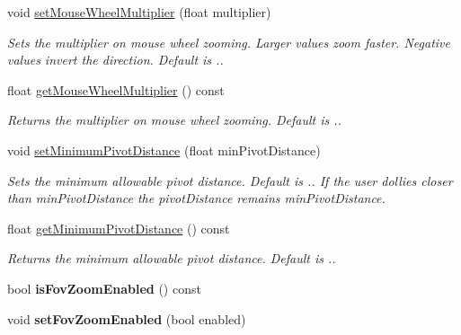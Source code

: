 \begin{DoxyCompactItemize}
\mbox{\label{classpepr3d_1_1_camera_ui_af34ec9925c96b8133cb4e69e2405532b}} 
void \mbox{\hyperlink{classpepr3d_1_1_camera_ui_af34ec9925c96b8133cb4e69e2405532b}{set\+Mouse\+Wheel\+Multiplier}} (float multiplier)
\begin{DoxyCompactList}\small\item\em Sets the multiplier on mouse wheel zooming. Larger values zoom faster. Negative values invert the direction. Default is {.}. \end{DoxyCompactList}\item 
\mbox{\label{classpepr3d_1_1_camera_ui_a92e74d770734c45b548318a71adc567e}} 
float \mbox{\hyperlink{classpepr3d_1_1_camera_ui_a92e74d770734c45b548318a71adc567e}{get\+Mouse\+Wheel\+Multiplier}} () const
\begin{DoxyCompactList}\small\item\em Returns the multiplier on mouse wheel zooming. Default is {.}. \end{DoxyCompactList}\item 
\mbox{\label{classpepr3d_1_1_camera_ui_a7e38eccabdb7ab5e70b232fee61e22c7}} 
void \mbox{\hyperlink{classpepr3d_1_1_camera_ui_a7e38eccabdb7ab5e70b232fee61e22c7}{set\+Minimum\+Pivot\+Distance}} (float min\+Pivot\+Distance)
\begin{DoxyCompactList}\small\item\em Sets the minimum allowable pivot distance. Default is {.}. If the user dollies closer than {\itshape min\+Pivot\+Distance} the pivot\+Distance remains {\itshape min\+Pivot\+Distance}. \end{DoxyCompactList}\item 
\mbox{\label{classpepr3d_1_1_camera_ui_ae52cbe0fd5f011dbc4ab77931e91071f}} 
float \mbox{\hyperlink{classpepr3d_1_1_camera_ui_ae52cbe0fd5f011dbc4ab77931e91071f}{get\+Minimum\+Pivot\+Distance}} () const
\begin{DoxyCompactList}\small\item\em Returns the minimum allowable pivot distance. Default is {.}. \end{DoxyCompactList}\item 
\mbox{\label{classpepr3d_1_1_camera_ui_a6ecea912a139846ebf3e0cb43f9a8fd0}} 
bool {\bfseries is\+Fov\+Zoom\+Enabled} () const
\item 
\mbox{\label{classpepr3d_1_1_camera_ui_a0f996ee16a333dd2fad1b641572a4e89}} 
void {\bfseries set\+Fov\+Zoom\+Enabled} (bool enabled)
\end{DoxyCompactItemize}

